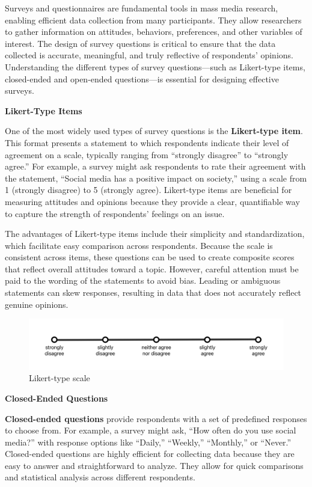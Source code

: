 \documentclass[
]{book}
\begin{document}
Surveys and questionnaires are fundamental tools in mass media research, enabling efficient data collection from many participants. They allow researchers to gather information on attitudes, behaviors, preferences, and other variables of interest. The design of survey questions is critical to ensure that the data collected is accurate, meaningful, and truly reflective of respondents' opinions. Understanding the different types of survey questions---such as Likert-type items, closed-ended and open-ended questions---is essential for designing effective surveys.

\textbf{Likert-Type Items}

One of the most widely used types of survey questions is the \textbf{Likert-type item}. This format presents a statement to which respondents indicate their level of agreement on a scale, typically ranging from ``strongly disagree'' to ``strongly agree.'' For example, a survey might ask respondents to rate their agreement with the statement, ``Social media has a positive impact on society,'' using a scale from 1 (strongly disagree) to 5 (strongly agree). Likert-type items are beneficial for measuring attitudes and opinions because they provide a clear, quantifiable way to capture the strength of respondents' feelings on an issue.

The advantages of Likert-type items include their simplicity and standardization, which facilitate easy comparison across respondents. Because the scale is consistent across items, these questions can be used to create composite scores that reflect overall attitudes toward a topic. However, careful attention must be paid to the wording of the statements to avoid bias. Leading or ambiguous statements can skew responses, resulting in data that does not accurately reflect genuine opinions.

\begin{figure}
\centering
\includegraphics[width=1\linewidth,height=\textheight,keepaspectratio]{images/likert-scale.png}
\caption{Likert-type scale}
\end{figure}

\textbf{Closed-Ended Questions}

\textbf{Closed-ended questions} provide respondents with a set of predefined responses to choose from. For example, a survey might ask, ``How often do you use social media?'' with response options like ``Daily,'' ``Weekly,'' ``Monthly,'' or ``Never.'' Closed-ended questions are highly efficient for collecting data because they are easy to answer and straightforward to analyze. They allow for quick comparisons and statistical analysis across different respondents.
\end{document}
